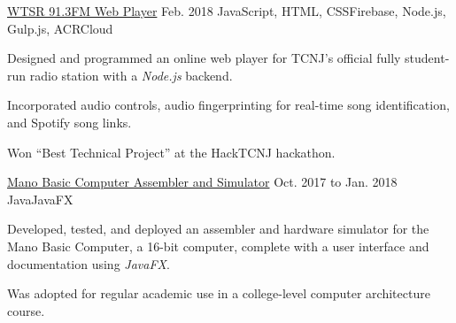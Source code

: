 \begin{cventry}
    {\href{https://wtsr.tomeraberba.ch}{WTSR 91.3FM Web Player}}{}
    {Feb. 2018}
    {JavaScript, HTML, CSS}{Firebase, Node.js, Gulp.js, ACRCloud}
    \begin{cvitems}
        \item Designed and programmed an online web player for TCNJ's official fully student-run radio station with a \textsl{Node.js} backend.
        \item Incorporated audio controls, audio fingerprinting for real-time song identification, and Spotify song links.
        \item Won ``Best Technical Project'' at the HackTCNJ hackathon.
    \end{cvitems}
\end{cventry}

\begin{cventry}
    {\href{https://github.com/TomerAberbach/mano-simulator}{Mano Basic Computer Assembler and Simulator}}{}
    {Oct. 2017 to Jan. 2018}
    {Java}{JavaFX}
    \begin{cvitems}
        \item Developed, tested, and deployed an assembler and hardware simulator for the Mano Basic Computer, a 16-bit computer, complete with a user interface and documentation using \textsl{JavaFX}.
        \item Was adopted for regular academic use in a college-level computer architecture course.
    \end{cvitems}
\end{cventry}
